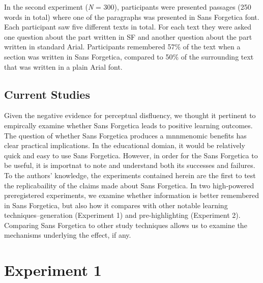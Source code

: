 \documentclass[english,doc]{apa6}
\begin{document}
In the second experiment (\emph{N} = 300), participants were presented passages (250 words in total) where one of the paragraphs was presented in Sans Forgetica font. Each participant saw five different texts in total. For each text they were asked one question about the part written in SF and another question about the part written in standard Arial. Participants remembered 57\% of the text when a section was written in Sans Forgetica, compared to 50\% of the surrounding text that was written in a plain Arial font.

\hypertarget{current-studies}{%
\subsection{Current Studies}\label{current-studies}}

Given the negative evidence for perceptual disfluency, we thought it pertinent to empircally examine whether Sans Forgetica leads to positive learning outcomes. The question of whether Sans Forgetica produces a mnnmenomic benefits has clear practical implications. In the educational domian, it would be relatively quick and easy to use Sans Forgetica. However, in order for the Sans Forgetica to be useful, it is importnat to note and understand both its successes and failures. To the authors' knowledge, the experiments contained herein are the first to test the replicabaility of the claims made about Sans Forgetica. In two high-powered preregistered experiments, we examine whether information is better remembered in Sans Forgetica, but also how it compares with other notable learning techniques--generation (Experiment 1) and pre-highlighting (Experiment 2). Comparing Sans Forgetica to other study techniques allows us to examine the mechanisms underlying the effect, if any.

\hypertarget{experiment-1}{%
\section{Experiment 1}\label{experiment-1}}
\end{document}
